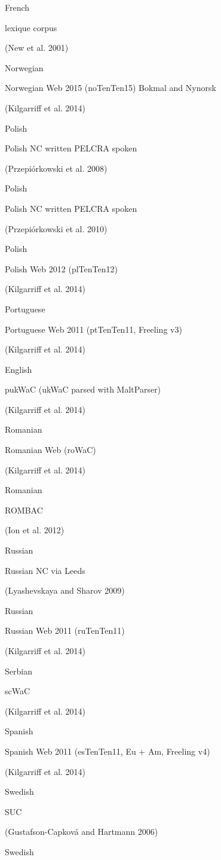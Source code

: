 \documentclass[]{article}
\begin{document}
French

lexique corpus

(New et al. 2001)

Norwegian

Norwegian Web 2015 (noTenTen15) Bokmal and Nynorsk

(Kilgarriff et al. 2014)

Polish

Polish NC written PELCRA spoken

(Przepiórkowski et al. 2008)

Polish

Polish NC written PELCRA spoken

(Przepiórkowski et al. 2010)

Polish

Polish Web 2012 (plTenTen12)

(Kilgarriff et al. 2014)

Portuguese

Portuguese Web 2011 (ptTenTen11, Freeling v3)

(Kilgarriff et al. 2014)

English

pukWaC (ukWaC parsed with MaltParser)

(Kilgarriff et al. 2014)

Romanian

Romanian Web (roWaC)

(Kilgarriff et al. 2014)

Romanian

ROMBAC

(Ion et al. 2012)

Russian

Russian NC via Leeds

(Lyashevskaya and Sharov 2009)

Russian

Russian Web 2011 (ruTenTen11)

(Kilgarriff et al. 2014)

Serbian

scWaC

(Kilgarriff et al. 2014)

Spanish

Spanish Web 2011 (esTenTen11, Eu + Am, Freeling v4)

(Kilgarriff et al. 2014)

Swedish

SUC

(Gustafson-Capková and Hartmann 2006)

Swedish
\end{document}
